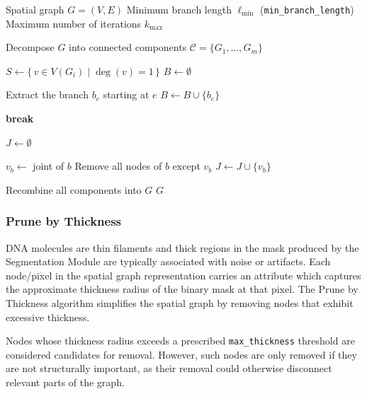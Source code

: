 \documentclass[english,12pt,a4paper]{article}
\begin{document}
	\begin{algorithm}[H]
		\caption{Prune Short Branches}
		\begin{algorithmic}[1]
			\Require Spatial graph $G=(V,E)$
			\Require Minimum branch length $\ell_{\min}$ (\texttt{min\_branch\_length})
			\Require Maximum number of iterations $k_{\max}$
			
			\Statex
			
			\State Decompose $G$ into connected components $\mathcal{C}=\{G_1,\dots,G_m\}$
			
			\State $S \gets \{\, v \in V(G_i) \mid \deg(v)=1 \,\}$ 
			\State $B \gets \emptyset$ 
			
			\State Extract the branch $b_e$ starting at $e$
			\State $B \gets B \cup \{b_e\}$
			\EndIf
			\EndFor
			
			\State \textbf{break}
			\EndIf
			
			\State $J \gets \emptyset$ 
			
			\State $v_b \gets$ joint of $b$
			\State Remove all nodes of $b$ except $v_b$
			\State $J \gets J \cup \{v_b\}$
			\EndIf
			\EndFor
			\EndFor
			\EndFor
			
			\State Recombine all components into $G$
			\State \Return $G$
		\end{algorithmic}
	\end{algorithm}
	
	\newpage
	
	\subsubsection{Prune by Thickness}
	
	DNA molecules are thin filaments and thick regions in the mask produced by the Segmentation Module are typically associated with noise or artifacts. Each node/pixel in the spatial graph representation carries an attribute which captures the approximate thickness radius of the binary mask at that pixel. The Prune by Thickness algorithm simplifies the spatial graph by removing nodes that exhibit excessive thickness.
	
	Nodes whose thickness radius exceeds a prescribed \texttt{max\_thickness} threshold are considered candidates for removal. However, such nodes are only removed if they are not structurally important, as their removal could otherwise disconnect relevant parts of the graph.
	
\end{document}

